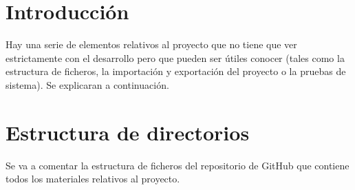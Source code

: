 
\section{Introducción}
Hay una serie de elementos relativos al proyecto que no tiene que ver estrictamente con el desarrollo pero que pueden ser útiles conocer (tales como la estructura de ficheros, la importación y exportación del proyecto o la pruebas de sistema). Se explicaran a continuación. 

\section{Estructura de directorios}
Se va a comentar la estructura de ficheros del repositorio de GitHub que contiene todos los materiales relativos al proyecto.

